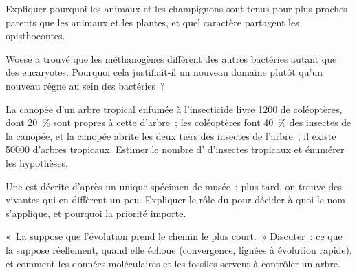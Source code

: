 \begin{exercise}[$\star\star$]\label{exo:b1:classifying-biodiversity:8}
Expliquer pourquoi les animaux et les champignons sont tenus pour plus
proches parents que les animaux et les plantes, et quel caractère
partagent les opisthocontes.
\end{exercise}

\begin{exercise}[$\star\star$]\label{exo:b1:classifying-biodiversity:9}
Woese a trouvé que les méthanogènes diffèrent des autres bactéries
autant que des eucaryotes. Pourquoi cela justifiait-il un nouveau
domaine plutôt qu'un nouveau règne au sein des bactéries~?
\end{exercise}

\begin{exercise}[$\star\star\star$]\label{exo:b1:classifying-biodiversity:10}
La canopée d'un arbre tropical enfumée à l'insecticide livre 1200
 de coléoptères, dont \qty{20}{\%} sont propres à cette 
d'arbre~; les coléoptères font \qty{40}{\%} des insectes de la canopée,
et la canopée abrite les deux tiers des insectes de l'arbre~; il existe
\num{50000}  d'arbres tropicaux. Estimer le nombre d'
d'insectes tropicaux et énumérer les hypothèses.
\end{exercise}

\begin{exercise}[$\star\star\star$]\label{exo:b1:classifying-biodiversity:11}
Une  est décrite d'après un unique spécimen de musée~; plus tard,
on trouve des  vivantes qui en diffèrent un peu. Expliquer
le rôle du  pour décider à quoi le nom s'applique, et
pourquoi la priorité importe.
\end{exercise}

\begin{exercise}[$\star\star\star$]\label{exo:b1:classifying-biodiversity:12}
«~La  suppose que l'évolution prend le chemin le plus
court.~» Discuter~: ce que la  suppose réellement, quand elle
échoue (convergence, lignées à évolution rapide), et comment les
données moléculaires et les fossiles servent à contrôler un arbre.
\end{exercise}

